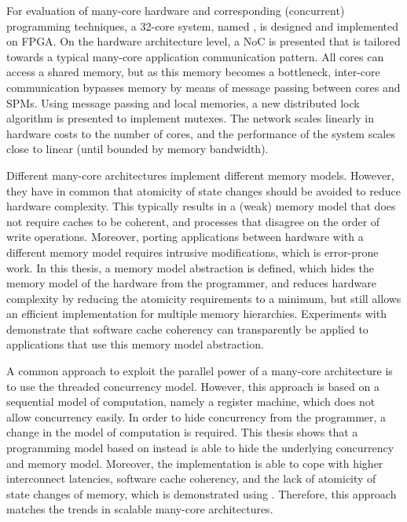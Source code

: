 For evaluation of many-core hardware and corresponding (concurrent) programming techniques, a 32-core \MicroBlaze system, named \Starburst, is designed and implemented on \ac{FPGA}.
On the hardware architecture level, a \acl{NoC} is presented that is tailored towards a typical many-core application communication pattern.
All cores can access a shared memory, but as this memory becomes a bottleneck, inter-core communication bypasses memory by means of message passing between cores and \aclp{SPM}.
Using message passing and local memories, a new distributed lock algorithm is presented to implement mutexes.
The network scales linearly in hardware costs to the number of cores, and the performance of the system scales close to linear (until bounded by memory bandwidth).

Different many-core architectures implement different memory models.
However, they have in common that atomicity of state changes should be avoided to reduce hardware complexity.
This typically results in a (weak) memory model that does not require caches to be coherent, and processes that disagree on the order of write operations. 
Moreover, porting applications between hardware with a different memory model requires intrusive modifications, which is error-prone work.
In this thesis, a memory model abstraction is defined, which hides the memory model of the hardware from the programmer, and reduces hardware complexity by reducing the atomicity requirements to a minimum, but still allows an efficient implementation for multiple memory hierarchies.
Experiments with \Starburst demonstrate that software cache coherency can transparently be applied to applications that use this memory model abstraction.

A common approach to exploit the parallel power of a many-core architecture is to use the threaded concurrency model.
However, this approach is based on a sequential model of computation, namely a register machine, which does not allow concurrency easily.
In order to hide concurrency from the programmer, a change in the model of computation is required.
This thesis shows that a programming model based on \lcalc instead is able to hide the underlying concurrency and memory model.
Moreover, the implementation is able to cope with higher interconnect latencies, software cache coherency, and the lack of atomicity of state changes of memory, which is demonstrated using \Starburst.
Therefore, this approach matches the trends in scalable many-core architectures.

